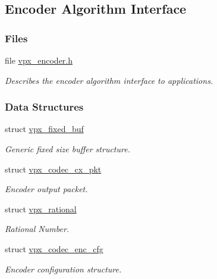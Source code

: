 \hypertarget{group__encoder}{\subsection{Encoder Algorithm Interface}
\label{group__encoder}
}
\subsubsection*{Files}
\begin{DoxyCompactItemize}
\item 
file \hyperlink{vpx__encoder_8h}{vpx\-\_\-encoder.\-h}
\begin{DoxyCompactList}\small\item\em Describes the encoder algorithm interface to applications. \end{DoxyCompactList}\end{DoxyCompactItemize}
\subsubsection*{Data Structures}
\begin{DoxyCompactItemize}
\item 
struct \hyperlink{structvpx__fixed__buf}{vpx\-\_\-fixed\-\_\-buf}
\begin{DoxyCompactList}\small\item\em Generic fixed size buffer structure. \end{DoxyCompactList}\item 
struct \hyperlink{structvpx__codec__cx__pkt}{vpx\-\_\-codec\-\_\-cx\-\_\-pkt}
\begin{DoxyCompactList}\small\item\em Encoder output packet. \end{DoxyCompactList}\item 
struct \hyperlink{structvpx__rational}{vpx\-\_\-rational}
\begin{DoxyCompactList}\small\item\em Rational Number. \end{DoxyCompactList}\item 
struct \hyperlink{structvpx__codec__enc__cfg}{vpx\-\_\-codec\-\_\-enc\-\_\-cfg}
\begin{DoxyCompactList}\small\item\em Encoder configuration structure. \end{DoxyCompactList}\end{DoxyCompactItemize}
